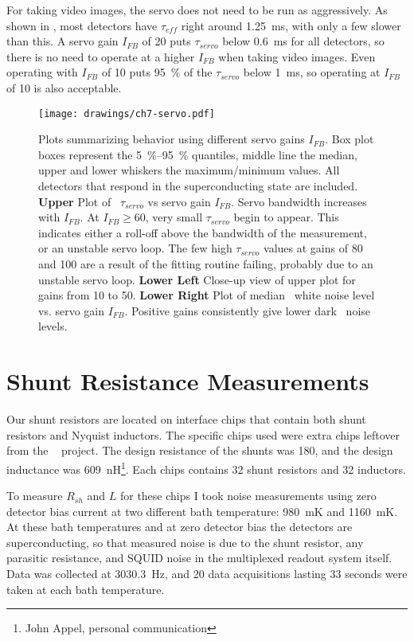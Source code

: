 For taking video images, the servo does not need to be run as aggressively.
As shown in , most detectors have $\tau_{eff}$ right around \SI{1.25}{\ms}, with only a few slower than this.
A servo gain $I_{FB}$ of 20 puts $\tau_{servo}$ below \SI{0.6}{\ms} for all detectors, so there is no need to operate at a higher $I_{FB}$ when taking video images.
Even operating with $I_{FB}$ of 10 puts \SI{95}{\percent} of the $\tau_{servo}$ below \SI{1}{\ms}, so operating at $I_{FB}$ of 10 is also acceptable.

\begin{figure*}
\texttt{[image: drawings/ch7-servo.pdf]}
\caption{Plots summarizing behavior using different servo gains $I_{FB}$.
  Box plot boxes represent the \SIrange{5}{95}{\percent} quantiles, middle line the median, upper and lower whiskers the maximum/minimum values.
All detectors that respond in the superconducting state are included.
\textbf{Upper} Plot of \SQUID\ $\tau_{servo}$ vs servo gain $I_{FB}$.
Servo bandwidth increases with $I_{FB}$.
At $I_{FB} \ge \num{60}$, very small $\tau_{servo}$ begin to appear. This indicates either a roll-off above the bandwidth of the measurement, or an unstable servo loop.
The few high $\tau_{servo}$ values at gains of 80 and 100 are a result of the fitting routine failing, probably due to an unstable servo loop.
\textbf{Lower Left} Close-up view of upper plot for gains from 10 to 50.
\textbf{Lower Right} Plot of median \SQUID\ white noise level vs. servo gain $I_{FB}$. Positive gains consistently give lower dark \SQUID\ noise levels.
}
\label{fig:ch7-servo}
\end{figure*}

\section{Shunt Resistance Measurements}\label{sec:shunt-nyquist}

Our shunt resistors are located on interface chips that contain both shunt resistors and Nyquist inductors.
The specific chips used were extra chips leftover from the \ABS\ \cite{kusaka_modulation_2013} project.
The design resistance of the shunts was \SI{180}{\uohm}, and the design inductance was 609~nH\footnote{John Appel, personal communication}.
Each chips contains 32 shunt resistors and 32 inductors.

To measure $R_{sh}$ and $L$ for these chips I took noise measurements using zero detector bias current at two different bath temperature: 980~mK and 1160~mK.
At these bath temperatures and at zero detector bias the detectors are superconducting, so that measured noise is due to the shunt resistor, any parasitic resistance, and SQUID noise in the multiplexed readout system itself.
Data was collected at 3030.3~Hz, and 20 data acquisitions lasting 33 seconds were taken at each bath temperature.

